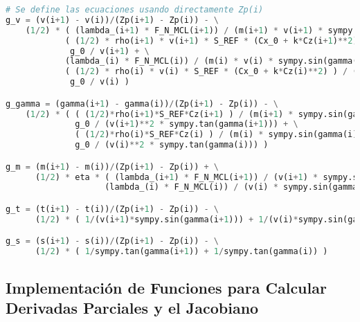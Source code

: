 \documentclass[fleqn]{article}
\begin{document}
\begin{lstlisting}[language=Python, firstnumber=last, style = mystyle]
# Se define las ecuaciones usando directamente Zp(i)
g_v = (v(i+1) - v(i))/(Zp(i+1) - Zp(i)) - \
    (1/2) * ( (lambda_(i+1) * F_N_MCL(i+1)) / (m(i+1) * v(i+1) * sympy.sin(gamma(i+1))) - \
            ( (1/2) * rho(i+1) * v(i+1) * S_REF * (Cx_0 + k*Cz(i+1)**2) ) / (m(i+1) * sympy.sin(gamma(i+1))) - \
             g_0 / v(i+1) + \
            (lambda_(i) * F_N_MCL(i)) / (m(i) * v(i) * sympy.sin(gamma(i))) - \
            ( (1/2) * rho(i) * v(i) * S_REF * (Cx_0 + k*Cz(i)**2) ) / (m(i) * sympy.sin(gamma(i))) - \
             g_0 / v(i) )

g_gamma = (gamma(i+1) - gamma(i))/(Zp(i+1) - Zp(i)) - \
    (1/2) * ( ( (1/2)*rho(i+1)*S_REF*Cz(i+1) ) / (m(i+1) * sympy.sin(gamma(i+1))) - \
              g_0 / (v(i+1)**2 * sympy.tan(gamma(i+1))) + \
              ( (1/2)*rho(i)*S_REF*Cz(i) ) / (m(i) * sympy.sin(gamma(i))) - \
              g_0 / (v(i)**2 * sympy.tan(gamma(i))) )

g_m = (m(i+1) - m(i))/(Zp(i+1) - Zp(i)) + \
      (1/2) * eta * ( (lambda_(i+1) * F_N_MCL(i+1)) / (v(i+1) * sympy.sin(gamma(i+1)))  + \
                    (lambda_(i) * F_N_MCL(i)) / (v(i) * sympy.sin(gamma(i))) )

g_t = (t(i+1) - t(i))/(Zp(i+1) - Zp(i)) - \
      (1/2) * ( 1/(v(i+1)*sympy.sin(gamma(i+1))) + 1/(v(i)*sympy.sin(gamma(i))) )

g_s = (s(i+1) - s(i))/(Zp(i+1) - Zp(i)) - \
      (1/2) * ( 1/sympy.tan(gamma(i+1)) + 1/sympy.tan(gamma(i)) )
\end{lstlisting}


\subsection{Implementación de Funciones para Calcular Derivadas Parciales y el Jacobiano}
\end{document}
